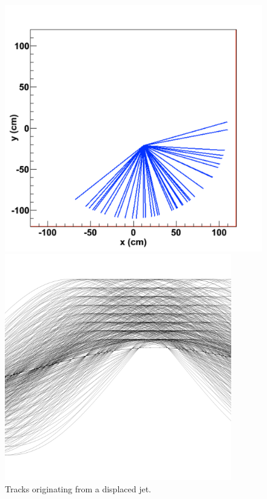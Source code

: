 \documentclass{JINST}
\begin{document}
\begin{figure}[!Hhtb]
\begin{minipage}[t]{4.9cm}
\begin{center}
	\includegraphics[width=1.\textwidth]{figs/jet1/tracks.pdf}
	\caption{Tracks originating from a displaced jet. \label{fig:jet1_tracks}}
	\end{center}
\end{minipage}
\begin{minipage}[t]{4.9cm}
\begin{center}
	\includegraphics[width=0.88\textwidth]{figs/jet1/accumulator.pdf}

\end{center}
\end{minipage}
\end{figure}
\end{document}
